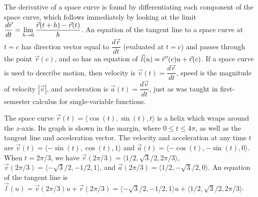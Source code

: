 The derivative of a space curve is found by differentiating each
component of the space curve, which follows immediately by looking at
the limit $\displaystyle\frac{d\vec r}{dt}=\lim_{h\to 0}\frac{\vec r(t+h)-\vec
  r(t)}{h}$. An equation of the tangent line to a space curve at $t=c$
has direction vector equal to $\dfrac{d\vec r}{dt}$ (evaluated at
$t=c$) and passes through the point $\vec r(c)$, and so has an equation of
$\vec l(u) = \vec r^{\,\prime}(c)u+\vec r(c)$. If a space curve is used to
describe motion, then velocity is $\vec v(t) = \dfrac{d\vec r}{dt}$,
speed is the magnitude of velocity $|\vec v|$, and acceleration is
$\vec a(t) = \dfrac{d\vec v}{dt}$, just as was taught in first-semester
calculus for single-variable functions.

\begin{example}

%



The space curve {$\vec r(t)=\langle\cos(t),\sin(t),t\rangle$} is a
helix which wraps around the $z$-axis.  Its graph is shown in the
margin, where $0\leq t\leq 4\pi$, as well as the tangent line and
acceleration vector. The velocity and acceleration at any time $t$ are
$\vec v(t) = \langle-\sin(t),\cos(t),1\rangle$ and $\vec a(t) =
\langle-\cos(t),-\sin(t),0\rangle$. When $t=2\pi/3$, we have $\vec
r(2\pi/3) = \langle1/2,\sqrt{3}/2,2\pi/3\rangle$, $\vec v(2\pi/3) =
\langle-\sqrt{3}/2,-1/2,1\rangle$, and $\vec a(2\pi/3) =
\langle1/2,-\sqrt{3}/2,0\rangle$. An equation of the tangent line is
$\vec l(u) = \vec v(2\pi/3)u+ \vec r(2\pi/3)=
\langle-\sqrt{3}/2,-1/2,1\rangle
u+\langle1/2,\sqrt{3}/2,2\pi/3\rangle$.
\end{example}


